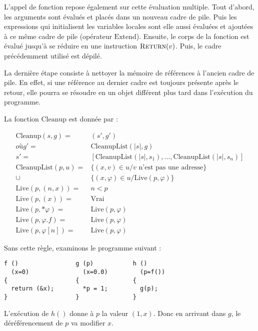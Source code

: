 L'appel de fonction repose également sur cette évaluation multiple. Tout
d'abord, les arguments sont évalués et placés dans un nouveau cadre de pile.
Puis les expressions qui initialisent les variables locales sont elle aussi
évaluées et ajoutées à ce même cadre de pile (opérateur $\mathrm{Extend}$).
Ensuite, le corps de la fonction est évalué jusqu'à se réduire en une
instruction $\textsc{Return}(v)$. Puis, le cadre précédemment utilisé est dépilé.

La dernière étape consiste à nettoyer la mémoire de références à l'ancien cadre
de pile. En effet, si une référence au dernier cadre est toujours présente après
le retour, elle pourra se résoudre en un objet différent plus tard dans
l'exécution du programme.

La fonction $\mathrm{Cleanup}$ est donnée par :

\def\cleanuplist#1#2{\mathrm{CleanupList}(#1, #2)}
\def\cllive#1#2{\mathrm{Live}(#1, #2)}

\begin{align*}
  \mathrm{Cleanup}(s, g)  = & (s', g') \\
                    où g' = & \cleanuplist{|s|}{g} \\
                       s' = & [\cleanuplist{|s|}{s_1},
                            …, \cleanuplist{|s|}{s_n}] \\
       \cleanuplist{p}{u} = & \{(x, v) ∈ u / v\mbox{ n'est pas une adresse} \} \\
                       \cup & \{(x, φ) ∈ u / \cllive{p}{φ} \} \\
    \cllive{p}{(n, x)} = & n < p \\
    \cllive{p}{(x)}    = & \mathrm{Vrai} \\
    \cllive{p}{*φ}     = & \cllive{p}{φ} \\
    \cllive{p}{φ.f}    = & \cllive{p}{φ} \\
    \cllive{p}{φ[n]}   = & \cllive{p}{φ}
\end{align*}

Sans cette règle, examinons le programme suivant :

\begin{Verbatim}
f ()                g (p)           h ()
  (x=0)               (x=0.0)         (p=f())
{                   {               {
  return (&x);        *p = 1;         g(p);
}                   }               }
\end{Verbatim}

L'exécution de $h()$ donne à $p$ la valeur $(1, x)$. Donc en arrivant dans $g$, le
déréférencement de $p$ va modifier $x$.

